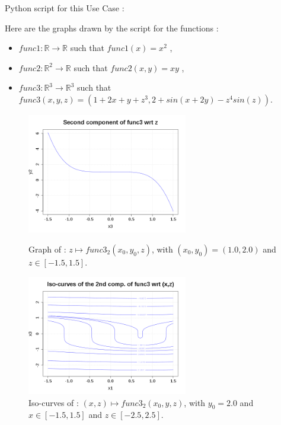              Python script for this Use Case :


             Here are the graphs drawn by the script for the functions :
             \begin{itemize}
             \item $func1 : \mathbb{R} \rightarrow \mathbb{R}$ such that $func1(x)  = x^2$ ,
             \item $func2 : \mathbb{R}^2 \rightarrow \mathbb{R}$ such that $func2(x,y)  = xy$ ,
             \item $func3 : \mathbb{R}^3 \rightarrow \mathbb{R}^3$ such that $func3(x,y,z)  =(1+2x+y+z^3, 2+sin(x+2y)-z^4sin(z))$.
             \end{itemize}


             \begin{figure}[H]
               \begin{minipage}{8cm}
                 \begin{center}
                   \includegraphics[width=7cm]{Figures/NMFgraph1.png}
                   \caption{Graph of : $ z \mapsto  func3_2(x_0,y_0,z)$, with $(x_0,y_0) = (1.0, 2.0)$ and $z\in [-1.5, 1.5]$.}
                   \label{graph1}
                 \end{center}
               \end{minipage}
               \hfill
               \begin{minipage}{8cm}
                 \begin{center}
                   \includegraphics[width=7cm]{Figures/NMFgraph2.png}
                   \caption{Iso-curves of : $ (x,z) \mapsto  func3_2(x_0,y,z)$, with $y_0 = 2.0$ and $x\in [-1.5, 1.5]$ and $z\in [-2.5, 2.5]$.}
                   \label{graph2}
                 \end{center}
               \end{minipage}
             \end{figure}


